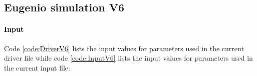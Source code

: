 \documentclass{article}
\begin{document}
\FloatBarrier  %
\subsection{Eugenio simulation V6}
\paragraph{Input} Code \ref{code:DriverV6} lists the input values for parameters used in the current driver file while code \ref{code:InputV6} lists the input values for parameters used in the current input file:




\end{document}
